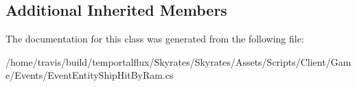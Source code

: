 \subsection*{Additional Inherited Members}


The documentation for this class was generated from the following file\-:\begin{DoxyCompactItemize}
\item 
/home/travis/build/temportalflux/\-Skyrates/\-Skyrates/\-Assets/\-Scripts/\-Client/\-Game/\-Events/Event\-Entity\-Ship\-Hit\-By\-Ram.\-cs\end{DoxyCompactItemize}
